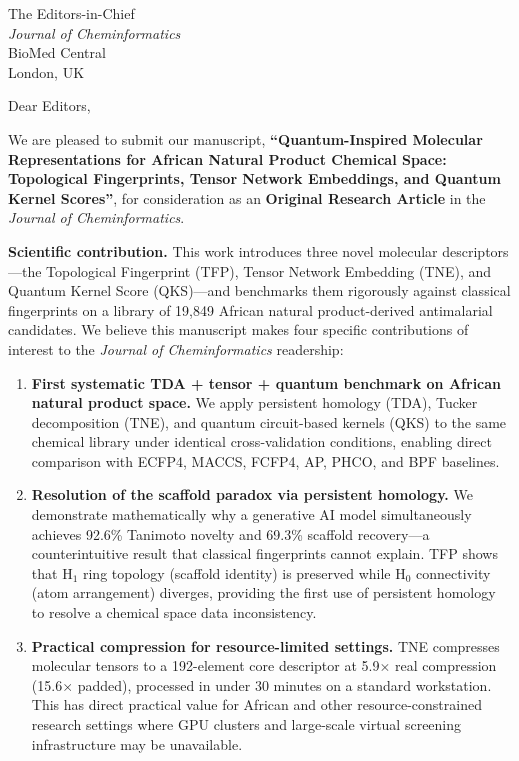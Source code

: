 \documentclass[11pt,a4paper]{letter}
\begin{document}
\begin{letter}{%
  The Editors-in-Chief \\
  \textit{Journal of Cheminformatics} \\
  BioMed Central \\
  London, UK
}

\opening{Dear Editors,}

We are pleased to submit our manuscript, \textbf{``Quantum-Inspired Molecular Representations for African Natural Product Chemical Space: Topological Fingerprints, Tensor Network Embeddings, and Quantum Kernel Scores''}, for consideration as an \textbf{Original Research Article} in the \textit{Journal of Cheminformatics}.

\medskip
\textbf{Scientific contribution.} This work introduces three novel molecular descriptors---the Topological Fingerprint (TFP), Tensor Network Embedding (TNE), and Quantum Kernel Score (QKS)---and benchmarks them rigorously against classical fingerprints on a library of 19,849 African natural product-derived antimalarial candidates. We believe this manuscript makes four specific contributions of interest to the \textit{Journal of Cheminformatics} readership:

\begin{enumerate}[leftmargin=*, itemsep=4pt]
  \item \textbf{First systematic TDA + tensor + quantum benchmark on African natural product space.}  
  We apply persistent homology (TDA), Tucker decomposition (TNE), and quantum circuit-based kernels (QKS) to the same chemical library under identical cross-validation conditions, enabling direct comparison with ECFP4, MACCS, FCFP4, AP, PHCO, and BPF baselines.

  \item \textbf{Resolution of the scaffold paradox via persistent homology.}  
  We demonstrate mathematically why a generative AI model simultaneously achieves 92.6\% Tanimoto novelty and 69.3\% scaffold recovery---a counterintuitive result that classical fingerprints cannot explain. TFP shows that H$_1$ ring topology (scaffold identity) is preserved while H$_0$ connectivity (atom arrangement) diverges, providing the first use of persistent homology to resolve a chemical space data inconsistency.

  \item \textbf{Practical compression for resource-limited settings.}  
  TNE compresses molecular tensors to a 192-element core descriptor at 5.9$\times$ real compression (15.6$\times$ padded), processed in under 30 minutes on a standard workstation. This has direct practical value for African and other resource-constrained research settings where GPU clusters and large-scale virtual screening infrastructure may be unavailable.


\end{enumerate}
\end{letter}
\end{document}
